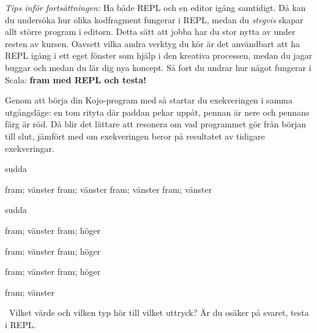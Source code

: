\begin{framed}
\noindent\emph{Tips inför fortsättningen:} Ha både REPL och en editor igång samtidigt. Då kan du undersöka hur olika kodfragment fungerar i REPL, medan du \emph{stegvis} skapar allt större program i editorn. Detta sätt att jobba har du stor nytta av under resten av kursen. Oavsett vilka andra verktyg du kör är det användbart att ha REPL igång i ett eget fönster som hjälp i den kreativa processen, medan du jagar buggar och medan du lär dig nya koncept. Så fort du undrar hur något fungerar i Scala: \textbf{fram med REPL och testa!}
\end{framed}


\SOLUTION

\TaskSolved \what

\SubtaskSolved Genom att börja din Kojo-program med  så startar du exekveringen i samma utgångsläge: en tom rityta  där paddan pekar uppåt, pennan är nere och pennans färg är röd.  Då blir det lättare att resonera om vad programmet gör från början till slut, jämfört med om exekveringen beror på resultatet av tidigare exekveringar.


\SubtaskSolved
\begin{Code}
sudda

fram; vänster
fram; vänster
fram; vänster
fram; vänster
\end{Code}


\SubtaskSolved
\begin{Code}
sudda

fram; vänster
fram; höger

fram; vänster
fram; höger

fram; vänster
fram; höger

fram; vänster
\end{Code}


\QUESTEND









\clearpage

\ExtraTasks %




\QUESTBEGIN

\Task \what~Vilket värde och vilken typ hör till vilket uttryck?  Är du osäker på svaret, testa i REPL.

\begin{ConceptConnections}[0.3\textwidth]

\end{ConceptConnections}

